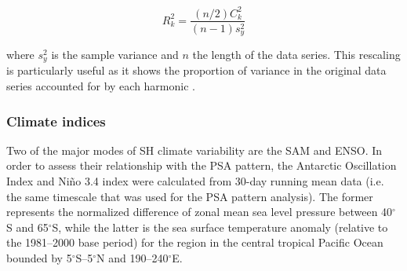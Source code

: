 \begin{equation}\label{eq:variance_explained}
R_k^2 = \frac{(n/2)C_k^2}{(n-1)s_y^2}
\end{equation}

\noindent where $s_y^2$ is the sample variance and $n$ the length of the data series. This rescaling is particularly useful as it shows the proportion of variance in the original data series accounted for by each harmonic \citep{Wilks2011}.

\subsubsection{Climate indices}
Two of the major modes of SH climate variability are the SAM and ENSO. In order to assess their relationship with the PSA pattern, the Antarctic Oscillation Index \citep{Gong1999} and Ni\~{n}o 3.4 index \citep{Trenberth2001} were calculated from 30-day running mean data (i.e. the same timescale that was used for the PSA pattern analysis). The former represents the normalized difference of zonal mean sea level pressure between 40$^{\circ}$S and 65$^{\circ}$S, while the latter is the sea surface temperature anomaly (relative to the 1981--2000 base period) for the region in the central tropical Pacific Ocean bounded by 5$^{\circ}$S--5$^{\circ}$N and 190--240$^{\circ}$E. 

